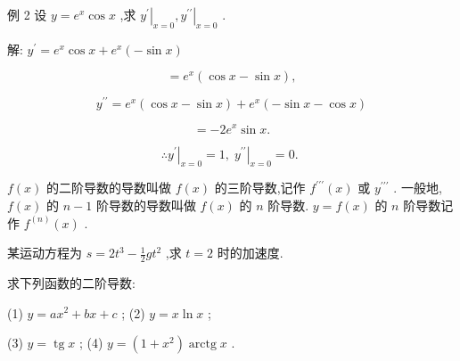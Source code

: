 \documentclass[lang=cn,newtx,10pt,scheme=chinese]{elegantbook}
\begin{document}
例 2 设 \(y = {e}^{x}\cos x\) ,求 \({\left. {y}^{\prime }\right| }_{x = 0},{\left. {y}^{\prime \prime }\right| }_{x = 0}\) .

解: \({y}^{\prime } = {e}^{x}\cos x + {e}^{x}\left( {-\sin x}\right)\)

\[
= {e}^{x}\left( {\cos x - \sin x}\right) ,
\]

\[
{y}^{\prime \prime } = {e}^{x}\left( {\cos x - \sin x}\right) + {e}^{x}\left( {-\sin x - \cos x}\right)
\]

\[
= - 2{e}^{x}\sin x\text{.}
\]

\[
\therefore {\left. {y}^{\prime }\right| }_{x = 0} = 1,{\left. \;{y}^{\prime \prime }\right| }_{x = 0} = 0\text{. }
\]

\(f\left( x\right)\) 的二阶导数的导数叫做 \(f\left( x\right)\) 的三阶导数,记作 \({f}^{\prime \prime \prime }\left( x\right)\) 或 \({y}^{\prime \prime \prime }\) . 一般地, \(f\left( x\right)\) 的 \(n - 1\) 阶导数的导数叫做 \(f\left( x\right)\) 的 \(n\) 阶导数. \(y = f\left( x\right)\) 的 \(n\) 阶导数记作 \({f}^{\left( n\right) }\left( x\right)\) .

\begin{problemset}[练习]

\item 某运动方程为 \(s = 2{t}^{3} - \frac{1}{2}g{t}^{2}\) ,求 \(t = 2\) 时的加速度.

\item 求下列函数的二阶导数:

(1) \(y = a{x}^{2} + {bx} + c\) ; (2) \(y = x\ln x\) ;

(3) \(y = \operatorname{tg}x\) ; (4) \(y = \left( {1 + {x}^{2}}\right) \operatorname{arctg}x\) .

\end{problemset}
\end{document}
